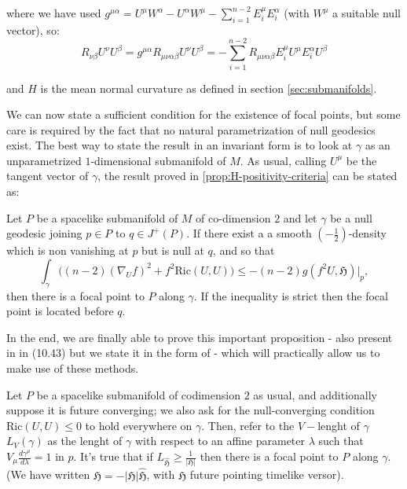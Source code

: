 where we have used \(g^{\mu\alpha} = U^{\mu}W^{\alpha} - U^{\alpha}W^{\mu} - \sum_{i=1}^{n - 2}E_i^{\mu}E_i^{\alpha}\) (with \(W^{\mu}\) a suitable null vector), so:
	\[
	R_{\nu\beta}U^{\nu}U^{\beta} = g^{\mu\alpha}R_{\mu\nu\alpha\beta}U^{\nu}U^{\beta} = - \sum_{i=1}^{n - 2}R_{\mu\nu\alpha\beta}E_i^{\mu}U^{\mu}E_i^{\alpha}U^{\beta}
	\]
	
	and \(H\) is the mean normal curvature as defined in section \ref{sec:submanifolds}.

	We can now state a sufficient condition for the existence of focal points, but some care is required by the fact that no natural parametrization of null geodesics exist.
	The best way to state the result in an invariant form is to look at \(\gamma\) as an unparametrized \(1\)-dimensional submanifold of \(M\).
	As usual, calling \(U^{\mu}\) be the tangent vector of \(\gamma\), the result proved in \ref{prop:H-positivity-criteria} can be stated as:
	\begin{prop}
		\label{prop:fp-criteria}
		Let \(P\) be a spacelike submanifold of \(M\) of co-dimension \(2\) and let \(\gamma\) be a null geodesic joining \(p \in P\) to \(q\in J^+(P)\). If there exist a a smooth \((-\frac{1}{2})\)-density which is non vanishing at \(p\) but is null at \(q\), and so that
		\begin{equation}
		\label{eq:fp-criteria}
		\int_{\gamma} \big((n -2)(\nabla_Uf)^2 + f^2\text{Ric}(U, U) \big)\le -(n -2) g(f^2 U, \mathfrak{H})\Big\vert_{p},
		\end{equation}
		then there is a focal point to \(P\) along \(\gamma\). If the inequality is strict then the focal point is located before \(q\).
	\end{prop}

	In the end, we are finally able to prove this important proposition - also present in \cite{o1983semi} in (10.43) but we state it in the form of \cite{fewster2020new}- which will practically allow us to make use of these methods.
	\begin{corollary}
		\label{cor:fp-criteria}
		Let \(P\) be a spacelike submanifold of codimension \(2\) as usual, and additionally suppose it is future converging; we also ask for the null-converging condition \(\text{Ric}(U, U) \le 0\) to hold everywhere on \(\gamma\). Then, refer to the \(V-\)lenght of \(\gamma\) \(L_V(\gamma)\) as the lenght of \(\gamma\) with respect to an affine parameter \(\lambda\) such that \(V_{\mu}\frac{d\gamma^{\mu}}{d\lambda} = 1\) in \(p\). It's true that if \(L_{\hat{\mathfrak{H}}} \ge \frac{1}{|\mathfrak{H}|}\) then there is a focal point to \(P\) along \(\gamma\). (We have written \(\mathfrak{H} = - |\mathfrak{H}|\hat{\mathfrak{H}}\), with \(\hat{\mathfrak{H}}\) future pointing timelike versor).
	\end{corollary}

